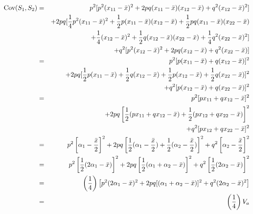 \begin{eqnarray*}
\mbox{Cov}(S_1,S_2) &=& p^2[p^2(x_{11} - {\bar x})^2 + 2pq(x_{11} - {\bar x})
                                                (x_{12} - {\bar x})
                                           + q^2(x_{12} - {\bar x})^2] \\
             &&+ 2pq[{1 \over 4}p^2(x_{11} - {\bar x})^2
                  + {1 \over 2}p(x_{11} - {\bar x})(x_{12} - {\bar x})
                  + {1 \over 2}pq(x_{11} - {\bar x})(x_{22} - {\bar x}) \\
             &&\ \ + {1 \over 4}(x_{12} - {\bar x})^2
                  + {1 \over 2}q(x_{12} - {\bar x})(x_{22} - {\bar x})
                  + {1 \over 4}q^2(x_{22} - {\bar x})^2] \\
             &&+ q^2[p^2(x_{12} - {\bar x})^2 + 2pq(x_{12} - {\bar x})
                                                 + q^2(x_{22} - {\bar
                                                x})] \\
   &=&\ p^2[p(x_{11} - {\bar x}) + q(x_{12} - {\bar x})]^2 \\
   &&+ 2pq[{1 \over 2}p(x_{11} - {\bar x}) +
         {1 \over 2}q(x_{12} - {\bar x}) +
         {1 \over 2}p(x_{12} - {\bar x}) +
         {1 \over 2}q(x_{22} - {\bar x})]^2 \\
   &&+ q^2[p(x_{12} - {\bar x}) + q(x_{22} - {\bar x})]^2 \\
   &=&\ p^2[px_{11} + qx_{12} - {\bar x}]^2 \\
   &&+ 2pq\left[{1 \over 2}(px_{11} + qx_{12} - {\bar x}) +
         {1 \over 2}(px_{12} + qx_{22} - {\bar x})\right]^2 \\
   &&+ q^2[px_{12} + qx_{22} - {\bar x}]^2 \\
   &=&\ p^2\left[\alpha_1 - {{\bar x} \over 2}\right]^2
   + 2pq\left[{1 \over 2}(\alpha_1 - {{\bar x} \over 2}) +
         {1 \over 2}(\alpha_2 - {{\bar x} \over 2})\right]^2
   + q^2\left[\alpha_2 - {{\bar x} \over 2}\right]^2 \\
   &=&\ p^2\left[{1 \over 2}(2\alpha_1 - {\bar x})\right]^2
   + 2pq\left[{1 \over 2}(\alpha_1 + \alpha_2 - {\bar x})\right]^2
        + q^2\left[{1 \over 2}(2\alpha_2 - {\bar x})\right]^2 \\
   &=& \left({1 \over 4}\right)
      \left[p^2(2\alpha_1 - {\bar x})^2
        + 2pq[(\alpha_1+\alpha_2 - {\bar x})]^2
        + q^2(2\alpha_2 - {\bar x})^2\right] \\
   &=& \left({1 \over 4}\right)V_a
\end{eqnarray*}

